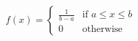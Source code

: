 \documentclass[preview]{standalone}
\begin{document}
\begin{align*}
f(x) = \begin{cases} \frac{1}{b-a} & \text{if } a \leq x \leq b \\ 0 & \text{otherwise} \end{cases}
\end{align*}
\end{document}
